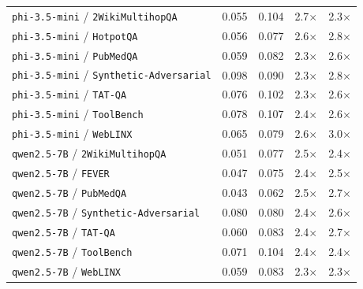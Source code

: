 \begin{longtable}{lcccc}
\texttt{phi-3.5-mini} / \texttt{2WikiMultihopQA} & 0.055 & 0.104 & 2.7$\times$ & 2.3$\times$ \\
\texttt{phi-3.5-mini} / \texttt{HotpotQA} & 0.056 & 0.077 & 2.6$\times$ & 2.8$\times$ \\
\texttt{phi-3.5-mini} / \texttt{PubMedQA} & 0.059 & 0.082 & 2.3$\times$ & 2.6$\times$ \\
\texttt{phi-3.5-mini} / \texttt{Synthetic-Adversarial} & 0.098 & 0.090 & 2.3$\times$ & 2.8$\times$ \\
\texttt{phi-3.5-mini} / \texttt{TAT-QA} & 0.076 & 0.102 & 2.3$\times$ & 2.6$\times$ \\
\texttt{phi-3.5-mini} / \texttt{ToolBench} & 0.078 & 0.107 & 2.4$\times$ & 2.6$\times$ \\
\texttt{phi-3.5-mini} / \texttt{WebLINX} & 0.065 & 0.079 & 2.6$\times$ & 3.0$\times$ \\
\texttt{qwen2.5-7B} / \texttt{2WikiMultihopQA} & 0.051 & 0.077 & 2.5$\times$ & 2.4$\times$ \\
\texttt{qwen2.5-7B} / \texttt{FEVER} & 0.047 & 0.075 & 2.4$\times$ & 2.5$\times$ \\
\texttt{qwen2.5-7B} / \texttt{PubMedQA} & 0.043 & 0.062 & 2.5$\times$ & 2.7$\times$ \\
\texttt{qwen2.5-7B} / \texttt{Synthetic-Adversarial} & 0.080 & 0.080 & 2.4$\times$ & 2.6$\times$ \\
\texttt{qwen2.5-7B} / \texttt{TAT-QA} & 0.060 & 0.083 & 2.4$\times$ & 2.7$\times$ \\
\texttt{qwen2.5-7B} / \texttt{ToolBench} & 0.071 & 0.104 & 2.4$\times$ & 2.4$\times$ \\
\texttt{qwen2.5-7B} / \texttt{WebLINX} & 0.059 & 0.083 & 2.3$\times$ & 2.3$\times$ \\
\bottomrule
\end{longtable}
